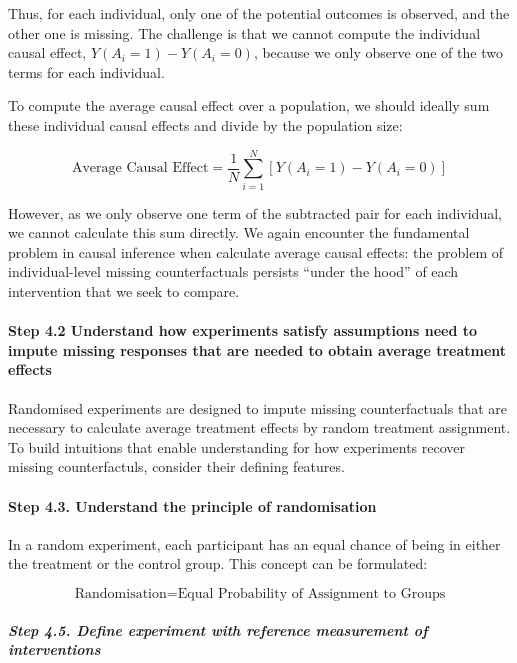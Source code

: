 \documentclass[
  singlecolumn]{article}
\let\oldparagraph\paragraph
\renewcommand{\paragraph}[1]{\oldparagraph{#1}\mbox{}}
\let\oldsubparagraph\subparagraph
\renewcommand{\subparagraph}[1]{\oldsubparagraph{#1}\mbox{}}
\begin{document}
Thus, for each individual, only one of the potential outcomes is
observed, and the other one is missing. The challenge is that we cannot
compute the individual causal effect, \(Y(A_i = 1) - Y(A_i = 0)\),
because we only observe one of the two terms for each individual.

To compute the average causal effect over a population, we should
ideally sum these individual causal effects and divide by the population
size:

\[
\text{Average Causal Effect} = \frac{1}{N}\sum_{i=1}^{N} [Y(A_i = 1) - Y(A_i = 0)]
\]

However, as we only observe one term of the subtracted pair for each
individual, we cannot calculate this sum directly. We again encounter
the fundamental problem in causal inference when calculate average
causal effects: the problem of individual-level missing counterfactuals
persists ``under the hood'' of each intervention that we seek to
compare.

\paragraph{Step 4.2 Understand how experiments satisfy assumptions need
to impute missing responses that are needed to obtain average treatment
effects}\label{step-4.2-understand-how-experiments-satisfy-assumptions-need-to-impute-missing-responses-that-are-needed-to-obtain-average-treatment-effects}

Randomised experiments are designed to impute missing counterfactuals
that are necessary to calculate average treatment effects by random
treatment assignment. To build intuitions that enable understanding for
how experiments recover missing counterfactuls, consider their defining
features.

\paragraph{\texorpdfstring{\textbf{Step 4.3. Understand the principle of
randomisation}}{Step 4.3. Understand the principle of randomisation}}\label{step-4.3.-understand-the-principle-of-randomisation}

In a random experiment, each participant has an equal chance of being in
either the treatment or the control group. This concept can be
formulated:

\[
\text{Randomisation} = \text{Equal Probability of Assignment to Groups}
\]

\subparagraph{\texorpdfstring{\textbf{Step 4.5. Define experiment with
reference measurement of
interventions}}{Step 4.5. Define experiment with reference measurement of interventions}}\label{step-4.5.-define-experiment-with-reference-measurement-of-interventions}
\end{document}
